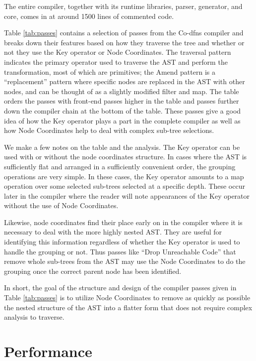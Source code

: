 ﻿\documentclass[numbers,10pt,preprint]{sigplanconf}
\begin{document}
The entire compiler, together with its runtime libraries, parser, generator, and core, comes in at around 1500 lines of commented code.

Table \ref{tab:passes} contains a selection of passes from the Co-dfns compiler and breaks down their features based on how they traverse the tree and whether or not they use the Key operator or Node Coordinates. The traversal pattern indicates the primary operator used to traverse the AST and perform the transformation, most of which are primitives; the Amend pattern is a ``replacement'' pattern where specific nodes are replaced in the AST with other nodes, and can be thought of as a slightly modified filter and map. The table orders the passes with front-end passes higher in the table and passes further down the compiler chain at the bottom of the table. These passes give a good idea of how the Key operator plays a part in the complete compiler as well as how Node Coordinates help to deal with complex sub-tree selections.

We make a few notes on the table and the analysis. The Key operator can be used with or without the node coordinates structure. In cases where the AST is sufficiently flat and arranged in a sufficiently convenient order, the grouping operations are very simple. In these cases, the Key operator amounts to a map operation over some selected sub-trees selected at a specific depth. These occur later in the compiler where the reader will note appearances of the Key operator without the use of Node Coordinates.

Likewise, node coordinates find their place early on in the compiler where it is necessary to deal with the more highly nested AST. They are useful for identifying this information regardless of whether the Key operator is used to handle the grouping or not. Thus passes like ``Drop Unreachable Code'' that remove whole sub-trees from the AST may use the Node Coordinates to do the grouping once the correct parent node has been identified.

In short, the goal of the structure and design of the compiler passes given in Table \ref{tab:passes} is to utilize Node Coordinates to remove as quickly as possible the nested structure of the AST into a flatter form that does not require complex analysis to traverse.

\section{Performance}
\end{document}
